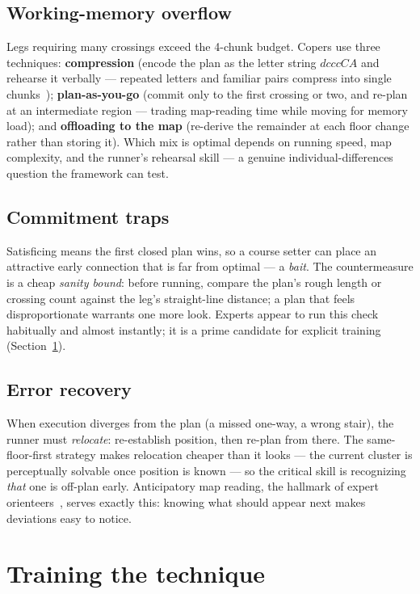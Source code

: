 \documentclass[11pt,a4paper,twocolumn]{article}
\begin{document}
\subsection{Working-memory overflow}
Legs requiring many crossings exceed the 4-chunk budget. Copers use three
techniques: \textbf{compression} (encode the plan as the letter string
$dcccCA$ and rehearse it verbally --- repeated letters and familiar pairs
compress into single chunks~\cite{chase1973,cowan2001});
\textbf{plan-as-you-go} (commit only to the first crossing or two, and
re-plan at an intermediate region --- trading map-reading time while moving
for memory load); and \textbf{offloading to the map} (re-derive the remainder
at each floor change rather than storing it). Which mix is optimal depends on
running speed, map complexity, and the runner's rehearsal skill --- a genuine
individual-differences question the framework can test.

\subsection{Commitment traps}
Satisficing means the first closed plan wins, so a course setter can place an
attractive early connection that is far from optimal --- a \emph{bait}. The
countermeasure is a cheap \emph{sanity bound}: before running, compare the
plan's rough length or crossing count against the leg's straight-line
distance; a plan that feels disproportionate warrants one more look. Experts
appear to run this check habitually and almost instantly; it is a prime
candidate for explicit training (Section~\ref{sec:training}).

\subsection{Error recovery}
When execution diverges from the plan (a missed one-way, a wrong stair), the
runner must \emph{relocate}: re-establish position, then re-plan from there.
The same-floor-first strategy makes relocation cheaper than it looks --- the
current cluster is perceptually solvable once position is known --- so the
critical skill is recognizing \emph{that} one is off-plan early. Anticipatory
map reading, the hallmark of expert orienteers~\cite{eccles2002}, serves
exactly this: knowing what should appear next makes deviations easy to
notice.

\section{Training the technique}
\label{sec:training}
\end{document}
